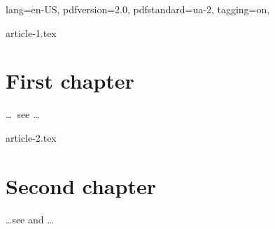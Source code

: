 \DocumentMetadata
  {
    lang=en-US,
    pdfversion=2.0,
    pdfstandard=ua-2,
    tagging=on,
  }
\begin{filecontents}[force]{article-1.tex}
\chapter{First chapter}
\ldots\ see \cite{inbook-full} \ldots


\end{filecontents}
\begin{filecontents}[force]{article-2.tex}
\chapter{Second chapter}
\ldots see \cite{inbook-full}
and \cite{article-full} \ldots


\end{filecontents}
\documentclass{report}

\usepackage[
  gather %
  ]{chapterbib} 





